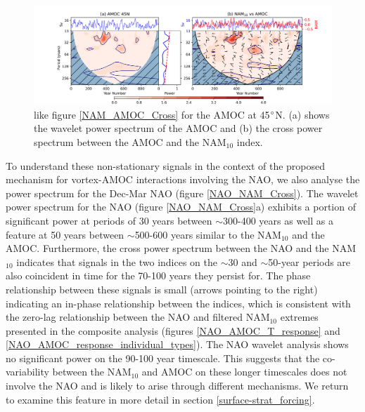 \begin{figure}[h!]
\begin{center}
\noindent\includegraphics[width = 0.95\linewidth]{Figures/Figures-surface/AMOC_NAM_filtered_subplot_45N.png}
\caption[Wavelet power spectrum of the AMOC at 45$\degree$N]{like figure \ref{NAM_AMOC_Cross} for the AMOC at 45$\degree$N. (a) shows the wavelet power spectrum of the AMOC and (b) the cross power spectrum between the AMOC and the NAM$_{10}$ index.}
\label{NAM_AMOC_Cross_45}
\end{center}
\end{figure}
  
To understand these non-stationary signals in the context of the proposed mechanism for vortex-AMOC interactions involving the NAO, we also analyse the power spectrum for the Dec-Mar NAO (figure \ref{NAO_NAM_Cross}). The wavelet power spectrum for the NAO (figure \ref{NAO_NAM_Cross}a) exhibits a portion of significant power at periods of 30 years between $\sim$300-400 years as well as a feature at 50 years between $\sim$500-600 years similar to the NAM$_{10}$ and the AMOC. Furthermore, the cross power spectrum between the NAO and the NAM$_{10}$ indicates that signals in the two indices on the $\sim$30 and $\sim$50-year periods are also coincident in time for the 70-100 years they persist for. The phase relationship between these signals is small (arrows pointing to the right) indicating an in-phase relationship between the indices, which is consistent with the zero-lag relationship between the NAO and filtered NAM$_{10}$ extremes presented in the composite analysis (figures \ref{NAO_AMOC_T_response} and \ref{NAO_AMOC_response_individual_types}). The NAO wavelet analysis shows no significant power on the 90-100 year timescale. This suggests that the co-variability between the NAM$_{10}$ and AMOC on these longer timescales does not involve the NAO and is likely to arise through different mechanisms. We return to examine this feature in more detail in section \ref{surface-strat_forcing}.

